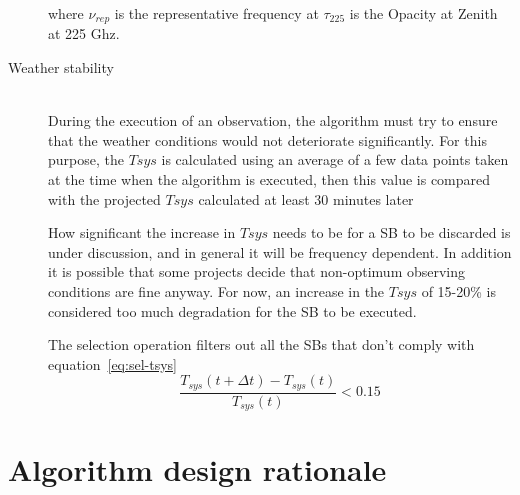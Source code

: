 \begin{description}
where $\nu_{rep}$ is the representative frequency at $\tau_{225}$ is the Opacity
at Zenith at 225 Ghz.

\item[Weather stability] \hfill \\
During the execution of an observation, the algorithm must try to ensure that the weather conditions would not deteriorate significantly.
For this purpose, the $Tsys$ is calculated using an average of a few data
points taken at the time when the algorithm is executed, then this value is compared with the
projected $Tsys$ calculated at least 30 minutes later

How significant the increase in $Tsys$ needs to be for a SB to be discarded
is under discussion, and in general it will be frequency dependent. In addition
it is possible that some projects decide that non-optimum observing conditions are
fine anyway. For now, an increase in the $Tsys$  of 15-20\% is considered too much
degradation for the SB to be executed.

The selection operation filters out all the SBs that don't comply with equation~\ref{eq:sel-tsys}
\begin{equation}
\label{eq:sel-tsys}
\frac{T_{sys}(t+\Delta t) - T_{sys}(t)}{T_{sys}(t)} < 0.15
\end{equation}

\end{description}

\section{Algorithm design rationale}

